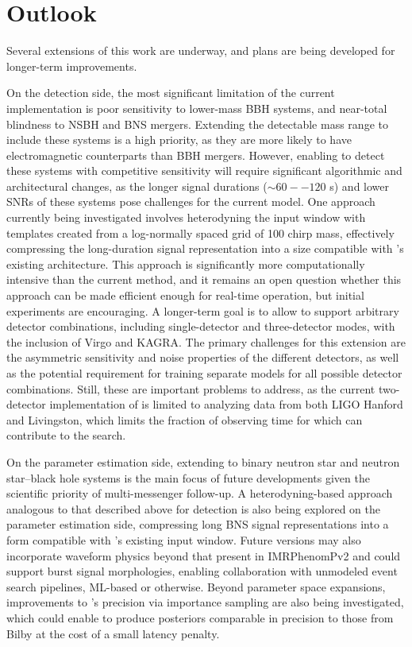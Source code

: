 \section{Outlook}

Several extensions of this work are underway, and plans are being developed for longer-term improvements.

On the detection side, the most significant limitation of the current \aframe implementation is poor sensitivity to lower-mass BBH systems, and near-total blindness to NSBH and BNS mergers.
Extending the detectable mass range to include these systems is a high priority, as they are more likely to have electromagnetic counterparts than BBH mergers.
However, enabling \aframe to detect these systems with competitive sensitivity will require significant algorithmic and architectural changes, as the longer signal durations ($\sim 60--120$ s) and lower SNRs of these systems pose challenges for the current model.
One approach currently being investigated involves heterodyning the input window with templates created from a log-normally spaced grid of 100 chirp mass, effectively compressing the long-duration signal representation into a size compatible with \aframe's existing architecture.
This approach is significantly more computationally intensive than the current method, and it remains an open question whether this approach can be made efficient enough for real-time operation, but initial experiments are encouraging.
A longer-term goal is to allow \aframe to support arbitrary detector combinations, including single-detector and three-detector modes, with the inclusion of Virgo and KAGRA.
The primary challenges for this extension are the asymmetric sensitivity and noise properties of the different detectors, as well as the potential requirement for training separate models for all possible detector combinations.
Still, these are important problems to address, as the current two-detector implementation of \aframe is limited to analyzing data from both LIGO Hanford and Livingston, which limits the fraction of observing time for which \aframe can contribute to the search.

On the parameter estimation side, extending \amplfi to binary neutron star and neutron star--black hole systems is the main focus of future developments given the scientific priority of multi-messenger follow-up.
A heterodyning-based approach analogous to that described above for detection is also being explored on the parameter estimation side, compressing long BNS signal representations into a form compatible with \amplfi's existing input window.
Future versions may also incorporate waveform physics beyond that present in IMRPhenomPv2 and could support burst signal morphologies, enabling collaboration with unmodeled event search pipelines, ML-based or otherwise.
Beyond parameter space expansions, improvements to \amplfi's precision via importance sampling are also being investigated, which could enable \amplfi to produce posteriors comparable in precision to those from Bilby at the cost of a small latency penalty.

